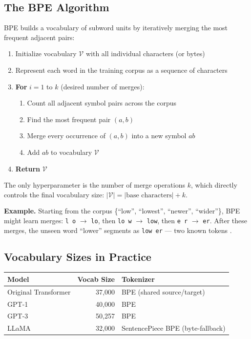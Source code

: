 \documentclass[11pt,a4paper]{article}
\begin{document}
\subsection{The BPE Algorithm}

BPE builds a vocabulary of subword units by iteratively merging the most frequent
adjacent pairs:

\begin{tcolorbox}[colback=white, colframe=black!50, title={Algorithm: BPE vocabulary construction \cite{sennrich2016}}]
\begin{enumerate}[nosep]
  \item Initialize vocabulary $\mathcal{V}$ with all individual characters (or bytes)
  \item Represent each word in the training corpus as a sequence of characters
  \item \textbf{For} $i = 1$ to $k$ (desired number of merges):
  \begin{enumerate}[nosep,label=\alph*.]
    \item Count all adjacent symbol pairs across the corpus
    \item Find the most frequent pair $(a, b)$
    \item Merge every occurrence of $(a, b)$ into a new symbol $ab$
    \item Add $ab$ to vocabulary $\mathcal{V}$
  \end{enumerate}
  \item \textbf{Return} $\mathcal{V}$
\end{enumerate}
\end{tcolorbox}

The only hyperparameter is the number of merge operations $k$, which directly controls
the final vocabulary size: $|\mathcal{V}| = |\text{base characters}| + k$.

\textbf{Example.} Starting from the corpus \{``low'', ``lowest'', ``newer'', ``wider''\},
BPE might learn merges: \texttt{l o} $\to$ \texttt{lo}, then \texttt{lo w} $\to$
\texttt{low}, then \texttt{e r} $\to$ \texttt{er}. After these merges, the unseen word
``lower'' segments as \texttt{low er} --- two known tokens \cite{sennrich2016}.

\subsection{Vocabulary Sizes in Practice}

\begin{center}
\begin{tabular}{lrl}
\toprule
\textbf{Model} & \textbf{Vocab Size} & \textbf{Tokenizer} \\
\midrule
Original Transformer \cite{vaswani2017} & 37,000 & BPE (shared source/target) \\
GPT-1 \cite{radford2018} & 40,000 & BPE \\
GPT-3 \cite{brown2020} & 50,257 & BPE \\
LLaMA \cite{touvron2023} & 32,000 & SentencePiece BPE (byte-fallback) \\
\bottomrule
\end{tabular}
\end{center}
\end{document}
